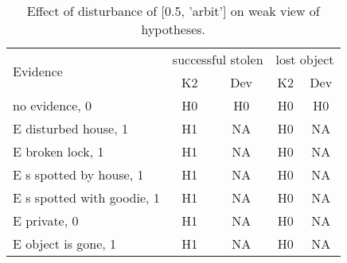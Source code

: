 \begin{table}\begin{tabular}{l|cc|cc}\toprule\multirow{2}{*}{Evidence} & \multicolumn{2}{c}{successful stolen}& \multicolumn{2}{c}{lost object}\\& {K2} & {Dev}& {K2} & {Dev}\\\midrule
no evidence, 0 & H0&H0&H0&H0\\E disturbed house, 1 & \cellcolor{Bittersweet}H1&\cellcolor{Bittersweet}NA&\cellcolor{Bittersweet}H0&\cellcolor{Bittersweet}NA\\E broken lock, 1 & \cellcolor{Bittersweet}H1&\cellcolor{Bittersweet}NA&\cellcolor{Bittersweet}H0&\cellcolor{Bittersweet}NA\\E s spotted by house, 1 & \cellcolor{Bittersweet}H1&\cellcolor{Bittersweet}NA&\cellcolor{Bittersweet}H0&\cellcolor{Bittersweet}NA\\E s spotted with goodie, 1 & \cellcolor{Bittersweet}H1&\cellcolor{Bittersweet}NA&\cellcolor{Bittersweet}H0&\cellcolor{Bittersweet}NA\\E private, 0 & \cellcolor{Bittersweet}H1&\cellcolor{Bittersweet}NA&\cellcolor{Bittersweet}H0&\cellcolor{Bittersweet}NA\\E object is gone, 1 & \cellcolor{Bittersweet}H1&\cellcolor{Bittersweet}NA&\cellcolor{Bittersweet}H0&\cellcolor{Bittersweet}NA\\\bottomrule\end{tabular}\caption{Effect of disturbance of [0.5, 'arbit'] on weak view of hypotheses.}\end{table}